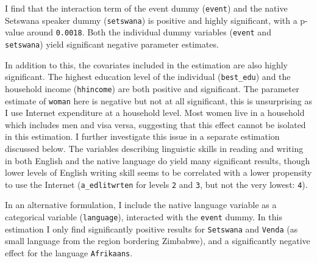 \documentclass[a4paper,british]{article}\usepackage[]{graphicx}\usepackage[]{color}
\providecommand*{\code}[1]{\texttt{#1}}
\begin{document}
I find that the interaction term of the event dummy (\code{event})
and the native Setswana speaker dummy (\code{setswana}) is positive
and highly significant, with a p-value around \code{0.0018}. Both
the individual dummy variables (\code{event} and \code{setswana})
yield significant negative parameter estimates.

In addition to this, the covariates included in the estimation are
also highly significant. The highest education level of the individual
(\code{best\_edu}) and the household income (\code{hhincome}) are
both positive and significant. The parameter estimate of \code{woman}
here is negative but not at all significant, this is unsurprising
as I use Internet expenditure at a household level. Most women live
in a household which includes men and visa versa, suggesting that
this effect cannot be isolated in this estimation. I further investigate
this issue in a separate estimation discussed below. The variables
describing linguistic skills in reading and writing in both English
and the native language do yield many significant results, though
lower levels of English writing skill seems to be correlated with
a lower propensity to use the Internet (\code{a\_edlitwrten} for
levels \code{2} and \code{3}, but not the very lowest: \code{4}).

In an alternative formulation, I include the native language variable
as a categorical variable (\code{language}), interacted with the
\code{event} dummy. In this estimation I only find significantly
positive results for \code{Setswana} and \code{Venda} (as small
language from the region bordering Zimbabwe), and a significantly
negative effect for the language \code{Afrikaans}.
\end{document}
